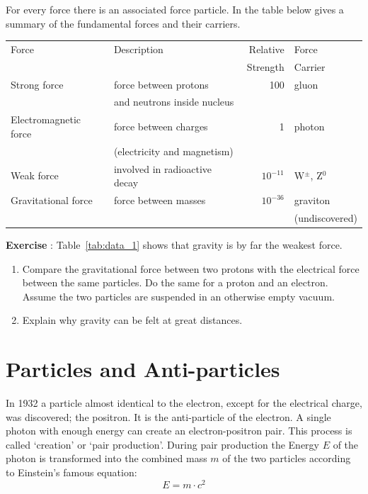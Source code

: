 \documentclass[12pt,a4paper]{article}
\numberwithin{equation}{section}
\numberwithin{figure}{section}
\newcounter{Exercise}
\numberwithin{table}{section}
\begin{document}
For every force there is an associated force particle. In the table below gives a summary of the fundamental forces and their carriers.

\begin{center}\begin{tabular}[h] {l l r l}
Force & Description & Relative & Force  \\
& & Strength & Carrier\\\hline
Strong force & force between protons  & 100 & gluon \\
& and neutrons inside nucleus\\
Electromagnetic force & force between charges & 1 & photon \\
& (electricity and magnetism) \\
Weak force & involved in radioactive decay & $10^{-11}$ & W$^\pm$, Z$^0$ \\
Gravitational force & force between masses & $10^{-36}$ & graviton \\
& & & (undiscovered)
\end{tabular}\end{center}
\label{tab:data_1}

\begin{shaded}
\textbf{Exercise \theExercise {}} : Table~\ref{tab:data_1} shows that gravity is by far the weakest force.
\begin{enumerate}[-]
\item Compare the gravitational force between two protons with the electrical force between the same particles. Do the same for a proton and an electron. Assume the two particles are suspended in an otherwise empty vacuum.
\item Explain why gravity can be felt at great distances.
\end{enumerate}\end{shaded}

\section{Particles and Anti-particles}
In 1932 a particle almost identical to the electron, except for the electrical charge, was discovered; the positron. It is the anti-particle of the electron. A single photon with enough energy can create an electron-positron pair. This process is called `creation' or `pair production'. During pair production the Energy $E$ of the photon is transformed into the combined mass $m$ of the two particles according to Einstein's famous equation:
\begin{equation}
E=m \cdot c^2
\end{equation}
\end{document}
